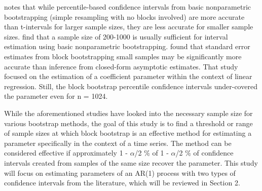 \documentclass[12pt, letterpaper, titlepage]{article}
\begin{document}
\citet{hesterberg2015teachers} notes that while percentile-based confidence intervals from basic nonparametric bootstrapping (simple resampling with no blocks involved) are more accurate than t-intervals for larger sample sizes, they are less accurate for smaller sample sizes. \citet{nevitt2001performance} find that a sample size of 200-1000 is usually sufficient for interval estimation using basic nonparametric bootstrapping.
\citet{goncalves2005bootstrap} found that standard error estimates from block bootstrapping small 
samples may be significantly more accurate than inference from closed-form asymptotic estimates. That study focused on the estimation of a coefficient parameter within the context of linear regression. Still, the block bootstrap percentile confidence intervals under-covered the parameter even for n = 1024. 

While the aforementioned studies have looked into the necessary sample size for various bootstrap methods, the goal of this study is to find a threshold or range of sample sizes at which block bootstrap 
is an effective method for estimating a parameter specifically in the context of a time series. The method can be considered effective if approximately 1 - $\alpha$/2 \% of 1 - $\alpha$/2 \% of confidence intervals created from samples of the same size recover the parameter. This study will focus on estimating parameters of an AR(1) process with two types of confidence intervals from the literature, \citep{diciccio1996bootstrap}  \citep{rice2006mathematical} which will be reviewed in Section 2.


\end{document}
